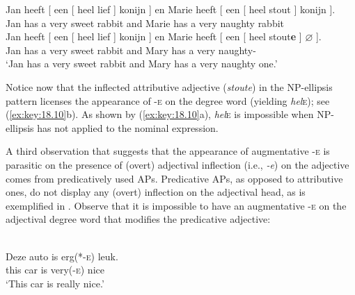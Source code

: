\documentclass[output=paper]{langsci/langscibook}
\begin{document}
\ea%
    \label{ex:key:18.9}
	\ea
	\gll Jan   heeft  [ een  [ heel  lief ] konijn ] en  Marie  heeft  [ een  [ heel  stout ]      konijn ].\\
    Jan    has    {}  a  {}  very    sweet {} rabbit {} and  Marie  has  {} a  {}  very    naughty {}    rabbit\\
	\glt
	\ex
	\gll Jan    heeft  [ een  [ heel  lief ]      konijn ] en  Marie  heeft  [ een  [ heel    stout\textbf{e} ] $\varnothing$ ].\\
    Jan    has  {}  a    {}  very    sweet {} rabbit  {}  and  Mary  has    {}
    a   {}   very    naughty-\Agr{}\\
	\glt \enquote*{Jan has a very sweet rabbit and Mary has a very naughty one.}
	\z
\z

Notice now that the inflected attributive adjective (\emph{stoute}) in the
NP-ellipsis pattern licenses the appearance of \textsc{-e} on the degree word
(yielding \emph{hel}\textsc{e}); see (\ref{ex:key:18.10}b). As shown by
(\ref{ex:key:18.10}a), \emph{hel}\textsc{e} is impossible when NP-ellipsis has not
applied to the nominal expression.

\ea%
\label{ex:key:18.10}
	\z
\z

A third observation that suggests that the appearance of augmentative
\textsc{-e} is parasitic on the presence of (overt) adjectival inflection
(i.e., \emph{-e}) on the adjective comes from predicatively used APs.
Predicative APs, as opposed to attributive ones, do not display any (overt)
inflection on the adjectival head, as is exemplified in .
Observe that it is impossible to have an augmentative \textsc{-e} on the
adjectival degree word that modifies the predicative adjective:

\ea%
\label{ex:key:18.11}\\
    \gll Deze    auto    is  erg(*-\textsc{e})    leuk.\\
        this      car      is  very(\textsc{-e})  nice\\
    \glt \enquote*{This car is really nice.}
\z
\end{document}
